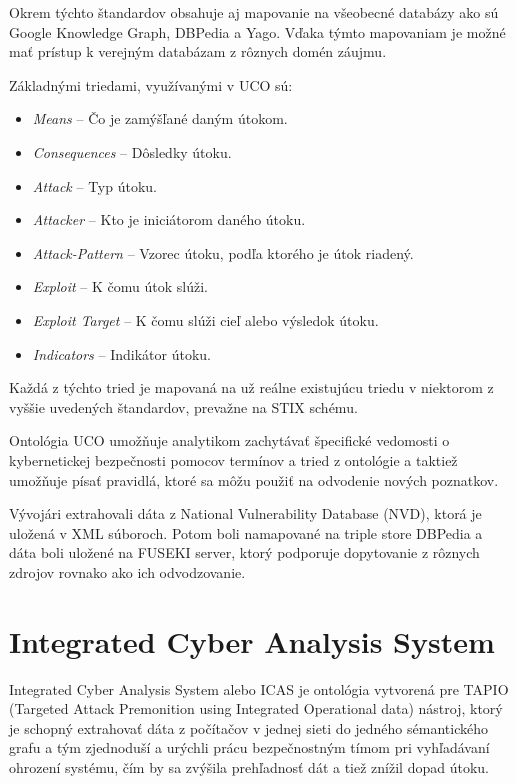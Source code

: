 \documentclass[12pt, a4paper, oneside]{book}
\begin{document}

Okrem týchto štandardov obsahuje aj mapovanie na všeobecné databázy ako sú Google Knowledge Graph, DBPedia a Yago. Vďaka týmto mapovaniam je možné mať prístup k verejným databázam z rôznych domén záujmu.


Základnými triedami, využívanými v UCO sú: 
\begin{itemize}
\item \textit{Means} -- Čo je zamýšľané daným útokom.
\item \textit{Consequences} -- Dôsledky útoku.
\item \textit{Attack} -- Typ útoku.
\item \textit{Attacker} -- Kto je iniciátorom daného útoku.
\item \textit{Attack-Pattern} -- Vzorec útoku, podľa ktorého je útok riadený.
\item \textit{Exploit} -- K čomu útok slúži.
\item \textit{Exploit Target} -- K čomu slúži cieľ alebo výsledok útoku.
\item \textit{Indicators} -- Indikátor útoku.
\end{itemize}
Každá z týchto tried je mapovaná na už reálne existujúcu triedu v niektorom z vyššie uvedených štandardov, prevažne na STIX schému.


Ontológia UCO umožňuje analytikom zachytávať špecifické vedomosti o kybernetickej bezpečnosti pomocov termínov a tried z ontológie a taktiež umožňuje písať pravidlá, ktoré sa môžu použiť na odvodenie nových poznatkov.


Vývojári extrahovali dáta z National Vulnerability Database (NVD), ktorá je uložená v XML súboroch. Potom boli namapované na triple store DBPedia a dáta boli uložené na FUSEKI server, ktorý podporuje dopytovanie z rôznych zdrojov rovnako ako ich odvodzovanie.



\section{Integrated Cyber Analysis System}
Integrated Cyber Analysis System\citep{salem2015enabling} alebo ICAS je ontológia vytvorená pre TAPIO (Targeted Attack Premonition using Integrated Operational data) nástroj, ktorý je schopný extrahovať dáta z počítačov v jednej sieti do jedného sémantického grafu a tým zjednoduší a urýchli prácu bezpečnostným tímom pri vyhľadávaní ohrození systému, čím by sa zvýšila prehľadnosť dát a tiež znížil dopad útoku. 
\end{document}
